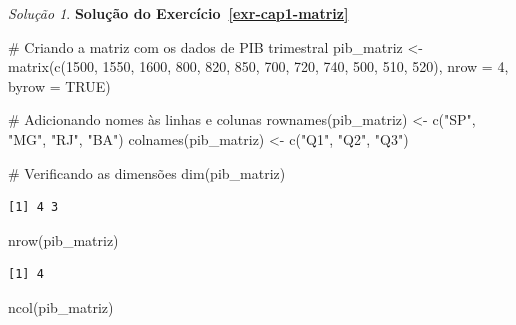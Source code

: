 \documentclass[
  portuguese,
  letterpaper,
  DIV=11,
  numbers=noendperiod]{scrreprt}
\newenvironment{Shaded}{\begin{snugshade}}{\end{snugshade}}
\newcommand{\AttributeTok}[1]{\textcolor[rgb]{0.40,0.45,0.13}{#1}}
\newcommand{\CommentTok}[1]{\textcolor[rgb]{0.37,0.37,0.37}{#1}}
\newcommand{\ConstantTok}[1]{\textcolor[rgb]{0.56,0.35,0.01}{#1}}
\newcommand{\DecValTok}[1]{\textcolor[rgb]{0.68,0.00,0.00}{#1}}
\newcommand{\FunctionTok}[1]{\textcolor[rgb]{0.28,0.35,0.67}{#1}}
\newcommand{\NormalTok}[1]{\textcolor[rgb]{0.00,0.23,0.31}{#1}}
\newcommand{\OtherTok}[1]{\textcolor[rgb]{0.00,0.23,0.31}{#1}}
\newcommand{\StringTok}[1]{\textcolor[rgb]{0.13,0.47,0.30}{#1}}
\theoremstyle{definition}
\theoremstyle{remark}
\newtheorem*{solution}{Solução}
\begin{document}
\begin{solution}
\textbf{Solução do Exercício~\ref{exr-cap1-matriz}}

\begin{Shaded}
\begin{Highlighting}[]
\CommentTok{\# Criando a matriz com os dados de PIB trimestral}
\NormalTok{pib\_matriz }\OtherTok{\textless{}{-}} \FunctionTok{matrix}\NormalTok{(}\FunctionTok{c}\NormalTok{(}\DecValTok{1500}\NormalTok{, }\DecValTok{1550}\NormalTok{, }\DecValTok{1600}\NormalTok{, }
                       \DecValTok{800}\NormalTok{, }\DecValTok{820}\NormalTok{, }\DecValTok{850}\NormalTok{, }
                       \DecValTok{700}\NormalTok{, }\DecValTok{720}\NormalTok{, }\DecValTok{740}\NormalTok{, }
                       \DecValTok{500}\NormalTok{, }\DecValTok{510}\NormalTok{, }\DecValTok{520}\NormalTok{), }
                     \AttributeTok{nrow =} \DecValTok{4}\NormalTok{, }\AttributeTok{byrow =} \ConstantTok{TRUE}\NormalTok{)}

\CommentTok{\# Adicionando nomes às linhas e colunas}
\FunctionTok{rownames}\NormalTok{(pib\_matriz) }\OtherTok{\textless{}{-}} \FunctionTok{c}\NormalTok{(}\StringTok{"SP"}\NormalTok{, }\StringTok{"MG"}\NormalTok{, }\StringTok{"RJ"}\NormalTok{, }\StringTok{"BA"}\NormalTok{)}
\FunctionTok{colnames}\NormalTok{(pib\_matriz) }\OtherTok{\textless{}{-}} \FunctionTok{c}\NormalTok{(}\StringTok{"Q1"}\NormalTok{, }\StringTok{"Q2"}\NormalTok{, }\StringTok{"Q3"}\NormalTok{)}

\CommentTok{\# Verificando as dimensões}
\FunctionTok{dim}\NormalTok{(pib\_matriz)}
\end{Highlighting}
\end{Shaded}

\begin{verbatim}
[1] 4 3
\end{verbatim}

\begin{Shaded}
\begin{Highlighting}[]
\FunctionTok{nrow}\NormalTok{(pib\_matriz)}
\end{Highlighting}
\end{Shaded}

\begin{verbatim}
[1] 4
\end{verbatim}

\begin{Shaded}
\begin{Highlighting}[]
\FunctionTok{ncol}\NormalTok{(pib\_matriz)}
\end{Highlighting}
\end{Shaded}


\end{solution}
\end{document}
